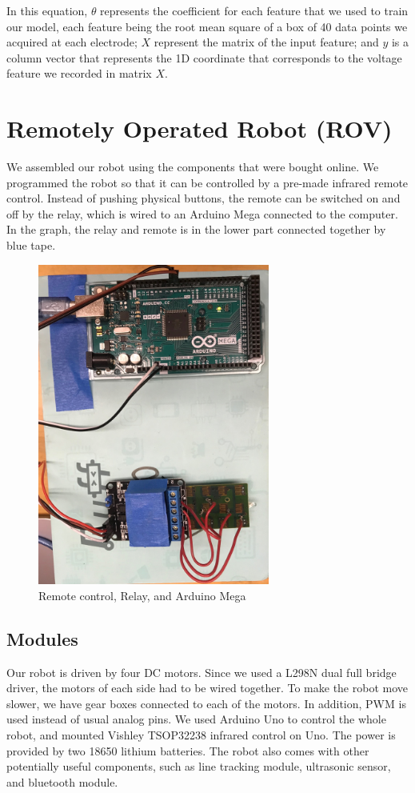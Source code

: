 \documentclass[reprint,amsmath, amsfonts, amssymb, aps, letterpaper]{revtex4-1}
\begin{document}
In this equation, $\theta$ represents the coefficient for each feature that we used to train our model, each feature being the root mean square of a box of 40 data points we acquired at each electrode; $X$ represent the matrix of the input feature; and $y$ is a column vector that represents the 1D coordinate that corresponds to the voltage feature we recorded in matrix $X$.

\section{Remotely Operated Robot (ROV)}
We assembled our robot using the components that were bought online. We programmed the robot so that it can be controlled by a pre-made infrared remote control. Instead of pushing physical buttons, the remote can be switched on and off by the relay, which is wired to an Arduino Mega connected to the computer. In the graph, the relay and remote is in the lower part connected together by blue tape.

\begin{figure}[!htb]
\begin{center}
\includegraphics[width=3in]{./figure/relay.jpg}
\caption{Remote control, Relay, and Arduino Mega}
\label{fig1}
\end{center}
\end{figure}

\subsection{Modules}
Our robot is driven by four DC motors. Since we used a L298N dual full bridge driver, the motors of each side had to be wired together. To make the robot move slower, we have gear boxes connected to each of the motors. In addition, PWM is used instead of usual analog pins. We used Arduino Uno to control the whole robot, and mounted Vishley TSOP32238 infrared control on Uno. The power is provided by two 18650 lithium batteries. The robot also comes with other potentially useful components, such as line tracking module, ultrasonic sensor, and bluetooth module.
\end{document}
